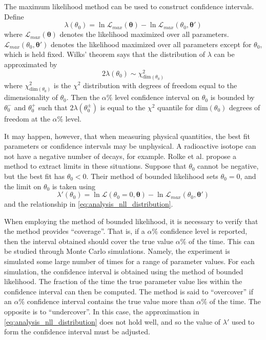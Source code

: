 \documentclass[herrin-thesis.tex]{subfiles}
\begin{document}
The maximum likelihood method can be used to construct confidence intervals. Define
\begin{equation}
\lambda({\theta_0}) = \ln \mathcal{L}_{max}(\boldsymbol{\theta}) - \ln \mathcal{L}_{max}(\theta_0, \boldsymbol{\theta}')
\end{equation}
where \(\mathcal{L}_{max}(\boldsymbol{\theta})\) denotes the likelihood maximized over all parameters. \(\mathcal{L}_{max}(\theta_0, \boldsymbol{\theta}')\) denotes the likelihood maximized over all parameters except for \(\theta_0\), which is held fixed. Wilks' theorem says that the distribution of \(\lambda\) can be approximated by
\begin{equation}
2\lambda(\theta_0) \sim \chi^2_{\text{dim}(\theta_0)}
\label{eq:analysis_nll_distribution}
\end{equation}
where \(\chi^2_{\text{dim}(\theta_0)}\) is the \(\chi^2\) distribution with degrees of freedom equal to the dimensionality of \(\theta_0\). Then the \(\alpha\%\) level confidence interval on \(\theta_0\) is bounded by \(\theta_0^-\) and \(\theta_0^+\) such that \(2\lambda(\theta_0^\pm)\) is equal to the \(\chi^2\) quantile for \(\text{dim}(\theta_0)\) degrees of freedom at the \(\alpha\%\) level.

It may happen, however, that when measuring physical quantities, the best fit parameters or confidence intervals may be unphysical. A radioactive isotope can not have a negative number of decays, for example. Rolke et al.\cite{Rolke:2005uq} propose a method to extract limits in these situations. Suppose that \(\theta_0\) cannot be negative, but the best fit has \(\theta_0 < 0\). Their method of bounded likelihood sets \(\theta_0 = 0\), and the limit on \(\theta_0\) is taken using
\begin{equation}
\lambda'({\theta_0}) = \ln \mathcal{L}(\theta_0 = 0, \boldsymbol{\theta}) - \ln \mathcal{L}_{max}(\theta_0, \boldsymbol{\theta}')
\end{equation}
and the relationship in \cref{eq:analysis_nll_distribution}.

When employing the method of bounded likelihood, it is necessary to verify that the method provides ``coverage''. That is, if a \(\alpha\%\) confidence level is reported, then the interval obtained should cover the true value \(\alpha\%\) of the time. This can be studied through Monte Carlo simulations. Namely, the experiment is simulated some large number of times for a range of parameter values. For each simulation, the confidence interval is obtained using the method of bounded likelihood. The fraction of the time the true parameter value lies within the confidence interval can then be computed. The method is said to ``overcover'' if an \(\alpha\%\) confidence interval contains the true value more than \(\alpha\%\) of the time. The opposite is to ``undercover''. In this case, the approximation in \cref{eq:analysis_nll_distribution} does not hold well, and so the value of \(\lambda'\) used to form the confidence interval must be adjusted.
\end{document}
